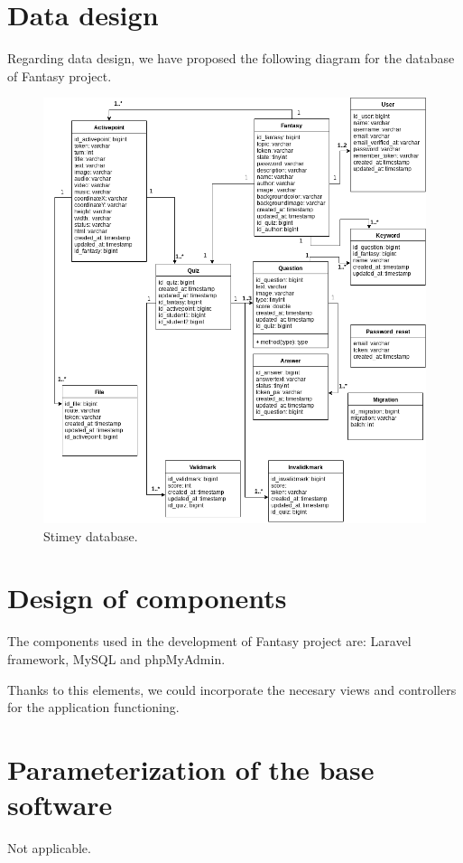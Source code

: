 \newpage
\section{Data design}
Regarding data design, we have proposed the following diagram for the database of Fantasy project.

\begin{figure}[h]
	\centering
	\includegraphics[scale=0.5]{Developing/StimeyUML.png}
	\caption{Stimey database.}
	\label{Stimey database}
\end{figure}

\section{Design of components}
The components used in the development of Fantasy project are: Laravel framework, MySQL and phpMyAdmin.

Thanks to this elements, we could incorporate the necesary views and controllers for the application functioning.

\section{Parameterization of the base software}
Not applicable.